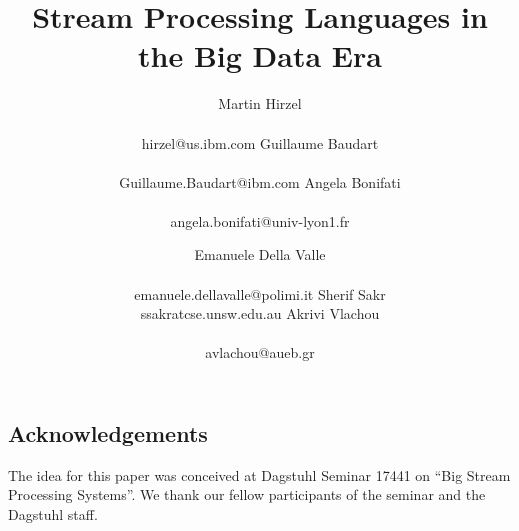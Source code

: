 \documentclass[preprint]{sig-alternate-10pt}
\begin{document}
\title{Stream Processing Languages in the Big Data Era}

\newcommand*{\emailn}[1]{\textsf{\normalsize #1}}

\author{
\alignauthor
Martin Hirzel\\
  \\
  \emailn{hirzel@us.ibm.com}
\alignauthor
Guillaume Baudart\\
  \\
  \emailn{Guillaume.Baudart@ibm.com}
\alignauthor
Angela Bonifati\\
  \\
  \emailn{angela.bonifati@univ-lyon1.fr}
\and
\alignauthor
Emanuele Della Valle\\
  \\
  \emailn{emanuele.dellavalle@polimi.it}
\alignauthor
Sherif Sakr\\
  \emailn{ssakratcse.unsw.edu.au}
\alignauthor
Akrivi Vlachou\\
  \\
  \emailn{avlachou@aueb.gr}}

\maketitle

\begin{abstract}
  
\end{abstract}







\subsection*{Acknowledgements}

The idea for this paper was conceived at Dagstuhl Seminar 17441 on
``Big Stream Processing Systems''. We thank our fellow participants of
the seminar and the Dagstuhl staff.


\balance

\end{document}
